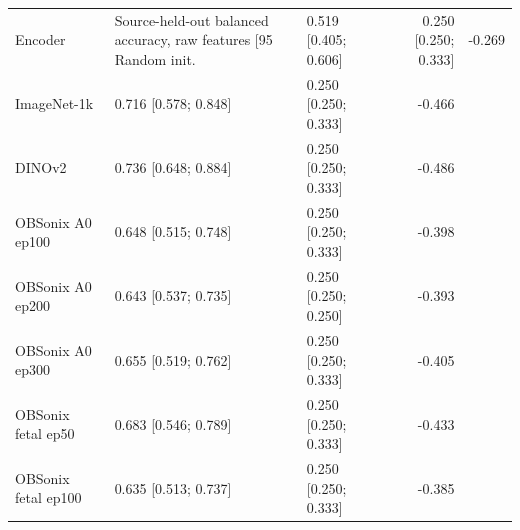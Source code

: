 \begin{tabular}{lllr}
\toprule
Encoder & Source-held-out balanced accuracy, raw features [95%
\midrule
Random init. & 0.519 [0.405; 0.606] & 0.250 [0.250; 0.333] & -0.269 \\
ImageNet-1k & 0.716 [0.578; 0.848] & 0.250 [0.250; 0.333] & -0.466 \\
DINOv2 & 0.736 [0.648; 0.884] & 0.250 [0.250; 0.333] & -0.486 \\
OBSonix A0 ep100 & 0.648 [0.515; 0.748] & 0.250 [0.250; 0.333] & -0.398 \\
OBSonix A0 ep200 & 0.643 [0.537; 0.735] & 0.250 [0.250; 0.250] & -0.393 \\
OBSonix A0 ep300 & 0.655 [0.519; 0.762] & 0.250 [0.250; 0.333] & -0.405 \\
OBSonix fetal ep50 & 0.683 [0.546; 0.789] & 0.250 [0.250; 0.333] & -0.433 \\
OBSonix fetal ep100 & 0.635 [0.513; 0.737] & 0.250 [0.250; 0.333] & -0.385 \\
\bottomrule
\end{tabular}
